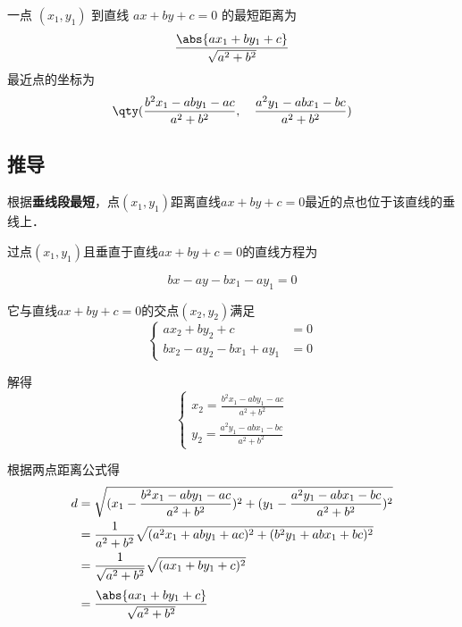 
\begin{issues}
\issueDraft
\end{issues}

一点 $(x_1,y_1)$ 到直线 $ax + by + c = 0$ 的最短距离为
\begin{equation}
\frac{\abs{ax_1 + by_1 + c}}{\sqrt{a^2 + b^2}}
\end{equation}
最近点的坐标为
\begin{equation}
\qty(
\frac{b^2x_1 - aby_1 - ac}{a^2 + b^2}, \quad
\frac{a^2y_1 - abx_1 - bc}{a^2 + b^2})
\end{equation}

\subsection{推导}

根据\textbf{垂线段最短}，点$(x_1, y_1)$距离直线$ax + by + c = 0$最近的点也位于该直线的垂线上．

过点$(x_1, y_1)$且垂直于直线$ax+by+c=0$的直线方程为

\begin{equation}
bx - ay - bx_1 - ay_1 = 0
\end{equation}

它与直线$ax + by + c = 0$的交点$(x_2, y_2)$满足
\begin{equation}
\left\lbrace
\begin{aligned}
ax_2 + by_2 + c &= 0\\
bx_2 - ay_2-bx_1 + ay_1 &= 0
\end{aligned}
\right.
\end{equation}

解得
\begin{equation}
\left\lbrace
\begin{aligned}
x_2=\frac{b^2x_1 - aby_1 - ac}{a^2 + b^2}\\
y_2=\frac{a^2y_1 - abx_1 - bc}{a^2 + b^2}
\end{aligned}
\right.
\end{equation}

根据两点距离公式得
\begin{equation}
\begin{split}
d&=\sqrt{(x_1-\frac{b^2x_1 - aby_1 - ac}{a^2 + b^2})^2 + (y_1-\frac{a^2y_1 - abx_1 - bc}{a^2 + b^2})^2}\\
&=\frac{1}{a^2 + b^2}\sqrt{(a^2x_1 + aby_1 + ac)^2 + (b^2y_1 + abx_1 + bc)^2}\\
&=\frac{1}{\sqrt{a^2 + b^2}}\sqrt{(ax_1 + by_1 + c)^2}\\[3pt]
&=\frac{\abs{ax_1 + by_1 + c}}{\sqrt{a^2 + b^2}}\\
\end{split}
\end{equation}


